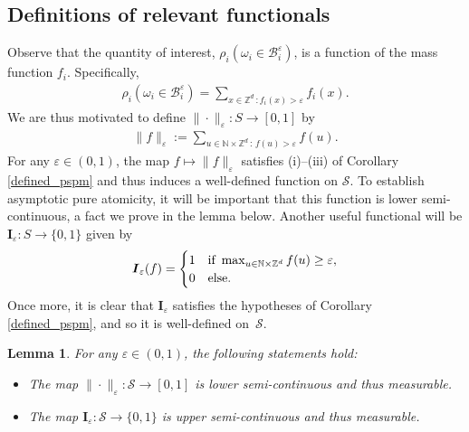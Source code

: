 \documentclass[11pt,reqno]{amsart}
\numberwithin{equation}{section}
\newtheorem{lemma}[thm]{Lemma}
\theoremstyle{definition}
\begin{document}
\subsection{Definitions of relevant functionals}
Observe that the quantity of interest, $\rho_i(\omega_i \in {\mathcal{B}}_i^{\varepsilon})$, is a function of the mass function $f_i$.
Specifically,
{\begin{align*} {
\rho_i(\omega_i \in {\mathcal{B}}_i^{\varepsilon}) = \sum_{x \in {\mathbb{Z}}^d\, : f_i(x) > {\varepsilon}} f_i(x).
} \end{align*}}
We are thus motivated to define $\|\cdot\|_{\varepsilon} : S \to [0,1]$ by
{\begin{align*} {
\|f\|_{\varepsilon} := \sum_{u\in{\mathbb{N}}\times{\mathbb{Z}}^d\, :\, f(u) > {\varepsilon}} f(u).
} \end{align*}}
For any ${\varepsilon} \in (0,1)$, the map $f \mapsto \|f\|_{\varepsilon}$ satisfies (i)--(iii) of Corollary \ref{defined_pspm} and thus induces a well-defined function on ${\mathcal{S}}$.
To establish asymptotic pure atomicity, it will be important that this function is lower semi-continuous, a fact we prove in the lemma below.
Another useful functional will be ${{\boldsymbol {I}}}_{\varepsilon} : S \to \{0,1\}$ given by
{\begin{align*} {
{{\boldsymbol {I}}}_{\varepsilon}(f) = \begin{cases}
1 &\textup{if } \max_{u \in {\mathbb{N}} \times {\mathbb{Z}}^d} f(u) \geq {\varepsilon}, \\
0 &\textup{else}.
\end{cases}
} \end{align*}}
Once more, it is clear that ${{\boldsymbol {I}}}_{\varepsilon}$ satisfies the hypotheses of Corollary \ref{defined_pspm}, and so it is well-defined on~${\mathcal{S}}$.

\begin{lemma} \label{eps_norm_equivalence}
For any ${\varepsilon} \in (0,1)$, the following statements hold:
\begin{itemize}
\item[(a)] The map $\|\cdot\|_{\varepsilon} : {\mathcal{S}} \to [0,1]$ is lower semi-continuous and thus measurable.
\item[(b)] The map ${{\boldsymbol {I}}}_{\varepsilon} : {\mathcal{S}} \to \{0,1\}$ is upper semi-continuous and thus measurable.
\end{itemize}
\end{lemma}
\end{document}
